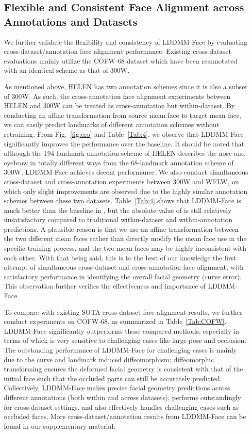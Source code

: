 \documentclass[10pt,twocolumn,letterpaper]{article}
\begin{document}
\subsection{Flexible and Consistent Face Alignment across Annotations and Datasets}
\label{across-annotation}
We further validate the flexibility and consistency of LDDMM-Face by evaluating cross-dataset/annotation face alignment performance. Existing cross-dataset evaluations mainly utilize the COFW-68 dataset which have been reannotated with an identical scheme as that of 300W.

As mentioned above, HELEN has two annotation schemes since it is also a subset of 300W. As such, the cross-annotation face alignment experiments between HELEN and 300W can be treated as cross-annotation but within-dataset. By conducting an affine transformation from source mean face to target mean face, we can easily predict landmarks of different annotation schemes without retraining. From Fig.~\ref{fig:cro} and Table~\ref{Tab:4}, we observe that LDDMM-Face significantly improves the performance over the baseline. It should be noted that although the 194-landmark annotation scheme of HELEN describes the nose and eyebrow in totally different ways from the 68-landmark annotation scheme of 300W, LDDMM-Face achieves decent performance. We also conduct simultaneous cross-dataset and cross-annotation experiments between 300W and WFLW, on which only slight improvements are observed due to the highly similar annotation schemes between these two datasets. Table~\ref{Tab:4} shows that LDDMM-Face is much better than the baseline in , but the absolute value of  is still relatively unsatisfactory compared to traditional within-dataset and within-annotation predictions. A plausible reason is that we use an affine transformation between the two different mean faces rather than directly modify the mean face use in the specific training process, and the two mean faces may be highly inconsistent with each other. With that being said, this is to the best of our knowledge the first attempt of simultaneous cross-dataset and cross-annotation face alignment, with satisfactory performance in identifying the overall facial geometry (curve error). This observation further verifies the effectiveness and importance of LDDMM-Face.

To compare with existing SOTA cross-dataset face alignment results, we further conduct experiments on COFW-68, as summarized in Table~\ref{Tab:COFW}. LDDMM-Face significantly outperforms those compared methods, especially in terms of  which is very sensitive to challenging cases like large pose and occlusion. The outstanding performance of LDDMM-Face for challenging cases is mainly due to the curve and landmark induced diffeomorphism; diffeomorphic transforming ensures the deformed facial geometry is consistent with that of the initial face such that the occluded parts can still be accurately predicted. Collectively, LDDMM-Face makes precise facial geometry predictions across different annotations (both within and across datasets), performs outstandingly for cross-dataset settings, and also effectively handles challenging cases such as occluded faces. More cross-dataset/annotation results from LDDMM-Face can be found in our supplementary material.
\end{document}
